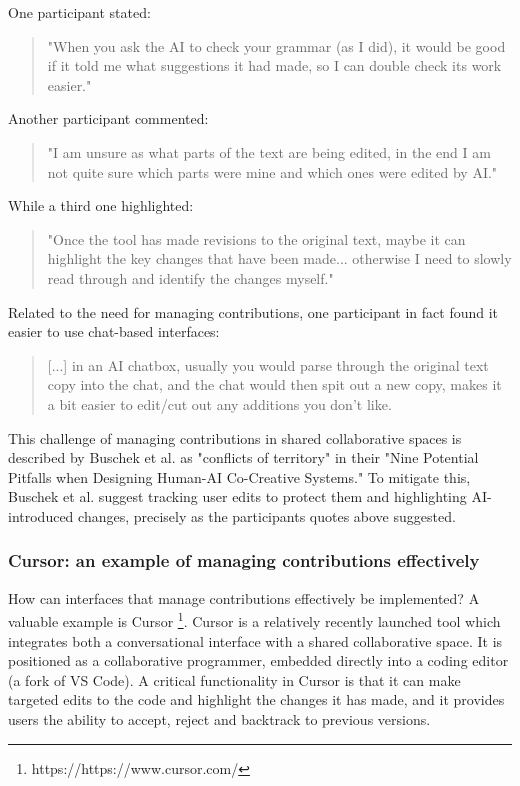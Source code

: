 One participant stated:
\begin{quote}
 "When you ask the AI to check your grammar (as I did), it would be good if it told me what suggestions it had made, so I can double check its work easier."
\end{quote}

Another participant commented:
\begin{quote}
    "I am unsure as what parts of the text are being edited, in the end I am not quite sure which parts were mine and which ones were edited by AI."
\end{quote}

While a third one highlighted: 

\begin{quote}
"Once the tool has made revisions to the original text, maybe it can highlight the key changes that have been made... otherwise I need to slowly read through and identify the changes myself."
\end{quote}

Related to the need for managing contributions, one participant in fact found it easier to use chat-based interfaces:
\begin{quote}
[...] in an AI chatbox, usually you would parse through the original text copy into the chat, and the chat would then spit out a new copy, makes it a bit easier to edit/cut out any additions you don't like.
\end{quote}

This challenge of managing contributions in shared collaborative spaces is described by Buschek et al. \cite{Buschek2021-ks} as "conflicts of territory" in their "Nine Potential Pitfalls when Designing Human-AI Co-Creative Systems." To mitigate this, Buschek et al. suggest tracking user edits to protect them and highlighting AI-introduced changes, precisely as the participants quotes above suggested.

\subsubsection{Cursor: an example of managing contributions effectively}

How can interfaces that manage contributions effectively be implemented? A valuable example is Cursor \footnote{https://https://www.cursor.com/}. Cursor is a relatively recently launched tool which integrates both a conversational interface with a shared collaborative space. It is positioned as a collaborative programmer, embedded directly into a coding editor (a fork of VS Code). A critical functionality in Cursor is that it can make targeted edits to the code and highlight the changes it has made, and it provides users the ability to accept, reject and backtrack to previous versions. 

